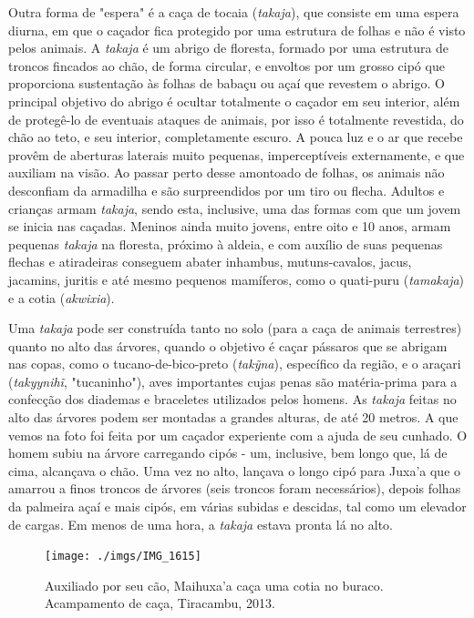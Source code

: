 Outra forma de "espera" é a caça de tocaia (\emph{takaja}), que consiste
em uma espera diurna, em que o caçador fica protegido por uma estrutura
de folhas e não é visto pelos animais. A \emph{takaja} é um abrigo de
floresta, formado por uma estrutura de troncos fincados ao chão, de
forma circular, e envoltos por um grosso cipó que proporciona
sustentação às folhas de babaçu ou açaí que revestem o abrigo. O
principal objetivo do abrigo é ocultar totalmente o caçador em seu
interior, além de protegê-lo de eventuais ataques de animais, por isso é
totalmente revestida, do chão ao teto, e seu interior, completamente
escuro. A pouca luz e o ar que recebe provêm de aberturas laterais muito
pequenas, imperceptíveis externamente, e que auxiliam na visão. Ao
passar perto desse amontoado de folhas, os animais não desconfiam da
armadilha e são surpreendidos por um tiro ou flecha. Adultos e crianças
armam \emph{takaja}, sendo esta, inclusive, uma das formas com que um
jovem se inicia nas caçadas. Meninos ainda muito jovens, entre oito e 10
anos, armam pequenas \emph{takaja} na floresta, próximo à aldeia, e com
auxílio de suas pequenas flechas e atiradeiras conseguem abater
inhambus, mutuns-cavalos, jacus, jacamins, juritis e até mesmo pequenos
mamíferos, como o quati-puru (\emph{tamakaja}) e a cotia
(\emph{akwixia}).

Uma \emph{takaja} pode ser construída tanto no solo (para a caça de
animais terrestres) quanto no alto das árvores, quando o objetivo é
caçar pássaros que se abrigam nas copas, como o tucano-de-bico-preto
(\emph{takỹna}), específico da região, e o araçari (\emph{takyynihĩ},
"tucaninho"), aves importantes cujas penas são matéria-prima para a
confecção dos diademas e braceletes utilizados pelos homens. As
\emph{takaja} feitas no alto das árvores podem ser montadas a grandes
alturas, de até 20 metros. A que vemos na foto foi feita por um caçador
experiente com a ajuda de seu cunhado. O homem subiu na árvore
carregando cipós - um, inclusive, bem longo que, lá de cima, alcançava o
chão. Uma vez no alto, lançava o longo cipó para Juxa'a que o amarrou a
finos troncos de árvores (seis troncos foram necessários), depois folhas
da palmeira açaí e mais cipós, em várias subidas e descidas, tal como um
elevador de cargas. Em menos de uma hora, a \emph{takaja} estava pronta
lá no alto.

\begin{figure}[H]
\centering
  \texttt{[image: ./imgs/IMG\_1615]}
\caption{Auxiliado por seu cão, Maihuxa’a caça uma cotia no buraco. Acampamento de caça, Tiracambu, 2013.}
\end{figure}

